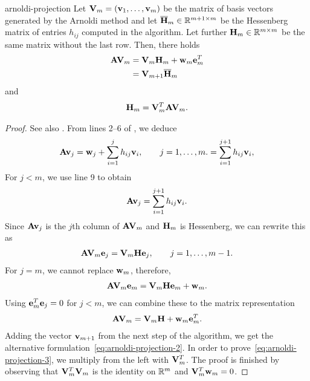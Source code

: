 \begin{Theorem}{arnoldi-projection}
  Let $\mathbf V_m = (\mathbf v_1,\dots,\mathbf v_m)$ be the matrix of basis vectors
  generated by the Arnoldi method and let
  $\overline{\mathbf H}_m\in\mathbb R^{m+1\times m}$ be the Hessenberg matrix of
  entries $h_{ij}$ computed in the algorithm. Let further
  $\mathbf H_m\in\mathbb R^{m\times m}$ be the same matrix without the last
  row. Then, there holds
  \begin{align}
    \label{eq:arnoldi-projection-1}
    \mathbf A\mathbf V_m &= \mathbf V_m\mathbf H_m+\mathbf w_m\mathbf e_m^T\\
    \label{eq:arnoldi-projection-2}
                 &= \mathbf V_{m+1}\overline{\mathbf H}_m
  \end{align}
  and
  \begin{gather}
    \label{eq:arnoldi-projection-3}
    \mathbf H_m = \mathbf V_m^T\mathbf A\mathbf V_m.
  \end{gather}
\end{Theorem}

\begin{proof}
  See also \cite[Proposition 6.5]{Saad00}.
  From lines 2--6 of , we deduce
  \begin{gather}
    \mathbf A \mathbf v_j = \mathbf w_j + \sum_{i=1}^j h_{ij} \mathbf v_i,
    \qquad j=1,\dots,m.
    =  \sum_{i=1}^{j+1} h_{ij} \mathbf v_i,
  \end{gather}
  For $j<m$, we use line 9 to obtain
  \begin{gather}
    \mathbf A \mathbf v_j =  \sum_{i=1}^{j+1} h_{ij} \mathbf v_i.
  \end{gather}
  Since $\mathbf A \mathbf v_j$ is the $j$th column of $\mathbf A\mathbf V_m$ and
  $\mathbf H_m$ is Hessenberg, we can rewrite this as
  \begin{gather}
    \mathbf A\mathbf V_m\mathbf e_j = \mathbf V_m\mathbf H\mathbf e_j,\qquad j=1,\dots,m-1.
  \end{gather}
  For $j=m$, we cannot replace $\mathbf w_m$, therefore,
  \begin{gather}
    \mathbf A\mathbf V_m\mathbf e_m = \mathbf V_m\mathbf H\mathbf e_m + \mathbf w_m.
  \end{gather}
  Using $\mathbf e_m^T\mathbf e_j=0$ for $j<m$, we can combine these to the matrix
  representation
  \begin{gather}
    \mathbf A\mathbf V_m = \mathbf V_m\mathbf H + \mathbf w_m\mathbf e_m^T.
  \end{gather}
  Adding the vector $\mathbf v_{m+1}$ from the next step of the algorithm,
  we get the alternative formulation~\eqref{eq:arnoldi-projection-2}.
  In order to prove~\eqref{eq:arnoldi-projection-3}, we multiply from
  the left with $\mathbf V_m^T$. The proof is finished by observing that
  $\mathbf V_m^T\mathbf V_m$ is the identity on $\mathbb R^m$ and $\mathbf V_m^T\mathbf w_m=0$.
\end{proof}

